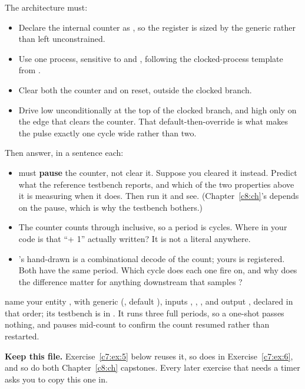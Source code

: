 \noindent The architecture must:
\begin{itemize}
  \item Declare the internal counter as , so the register is
    sized by the generic rather than left unconstrained.
  \item Use one process, sensitive to  and , following the
    clocked-process template from .
  \item Clear both the counter and  on reset, outside the clocked branch.
  \item Drive  low unconditionally at the top of the clocked branch, and high only on
    the edge that clears the counter. That default-then-override is what makes the pulse exactly
    one cycle wide rather than two.
\end{itemize}
Then answer, in a sentence each:
\begin{itemize}
  \item {} must \textbf{pause} the counter, not clear it. Suppose you cleared it
    instead. Predict what the reference testbench reports, and which of the two properties above it
    is measuring when it does. Then run it and see. (Chapter~\ref{c8:ch}'s  depends
    on the pause, which is why the testbench bothers.)
  \item The counter counts  through  inclusive, so a period is
     cycles. Where in your code is that ``+ 1'' actually written? It is not a
    literal anywhere.
  \item {}'s hand-drawn  is a combinational decode of the count; yours is
    registered. Both have the same period. Which cycle does each one fire on, and why does the
    difference matter for anything downstream that samples ?
\end{itemize}


\selfcheck name your entity , with generic  (, default
), inputs , , , and output
, declared in that order; its testbench is in . It runs three
full periods, so a one-shot passes nothing, and pauses mid-count to confirm the count resumed rather
than restarted.

\textbf{Keep this file.} Exercise~\ref{c7:ex:5} below reuses it, so does  in
Exercise~\ref{c7:ex:6}, and so do both Chapter~\ref{c8:ch} capstones. Every later exercise that
needs a timer asks you to copy this one in.

